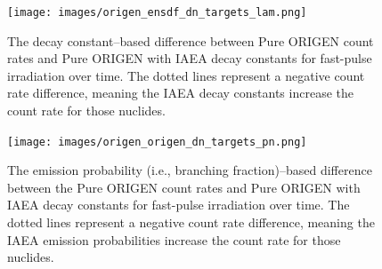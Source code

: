 \documentclass{style/nseJournal}
\begin{document}
\begin{figure}[]
\centering
\texttt{[image: images/origen\_ensdf\_dn\_targets\_lam.png]}
\caption{The decay constant--based difference between Pure ORIGEN count rates and Pure ORIGEN with IAEA decay constants for  fast-pulse irradiation over time. The dotted lines represent a negative count rate difference, meaning the IAEA decay constants increase the count rate for those nuclides.}
\label{fig:start-comp}
\end{figure}

%


\begin{figure}[]
\centering
\texttt{[image: images/origen\_origen\_dn\_targets\_pn.png]}
\caption{The emission probability (i.e., branching fraction)--based difference between the Pure ORIGEN count rates and Pure ORIGEN with IAEA decay constants for  fast-pulse irradiation over time. The dotted lines represent a negative count rate difference, meaning the IAEA emission probabilities increase the count rate for those nuclides.}
\label{fig:emis-prob}
\end{figure}
\end{document}
